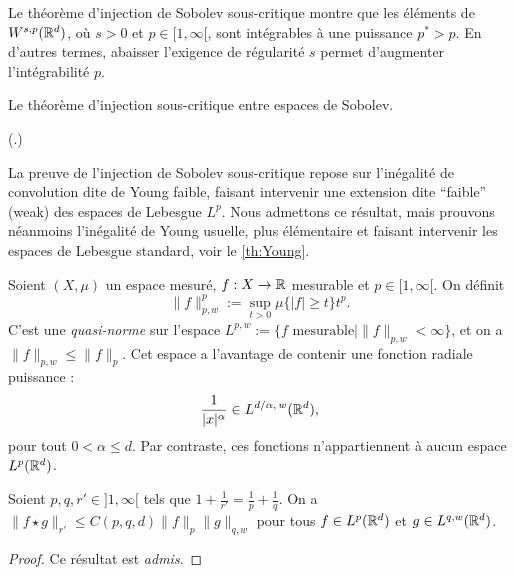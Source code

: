 Le théorème d'injection de Sobolev sous-critique montre que les éléments de $W^{s,p}(\mathbb{R}^d)$, où $s>0$ et $p\in [1,\infty[$, sont intégrables à une puissance $p^*>p$. En d'autres termes, abaisser l'exigence de régularité $s$ permet d'augmenter l'intégrabilité $p$. 

\begin{retenir}
Le théorème d'injection sous-critique entre espaces de Sobolev.

\noindent
(.)	
\end{retenir}

La preuve de l'injection de Sobolev sous-critique repose sur l'inégalité de convolution dite de Young faible, faisant intervenir une extension dite ``faible'' (weak) des espaces de Lebesgue  $L^p$. Nous admettons ce résultat, mais prouvons néanmoins l'inégalité de Young usuelle, plus élémentaire et faisant intervenir les espaces de Lebesgue standard, voir le \cref{th:Young}.

Soient $(X,\mu)$ un espace mesuré, $f : X \to \mathbb{R}$ mesurable et $p \in [1,\infty[$. On définit 
\begin{equation*}
	\|f\|^p_{p,w} := \sup_{t > 0} \mu\{|f|\geq t\} t^p.
\end{equation*}
C'est une \emph{quasi-norme} sur l'espace $L^{p,w} := \{f \text{ mesurable}\mid \|f\|_{p,w} < \infty\}$, et on a $\|f\|_{p,w} \leq \|f\|_p$. 
Cet espace a l'avantage de contenir une fonction radiale puissance : 
\begin{equation}
\label{eq:powLpw}
	\frac 1 {|x|^\alpha} \in L^{d/\alpha,\, w} (\bR^d),
\leancheck{eq:powLpw}%
\end{equation}
pour tout $0< \alpha \leq d$. Par contraste, ces fonctions n'appartiennent à aucun espace $L^p (\mathbb{R}^d)$.

\begin{theorem}
\label{th:YoungFaible}
%
	Soient $p,q,r'\in ]1,\infty[$ tels que $1+ \frac 1 {r'} = \frac 1 p + \frac 1 q$. 
	On a 
	$\|f\star g \|_{r'} \leq C(p,q,d) \|f\|_p \|g\|_{q,w}$ pour tous $f \in L^p(\mathbb{R}^d)$ et $g\in L^{q,w}(\mathbb{R}^d)$.
\end{theorem}

\begin{proof}
	Ce résultat est \emph{admis}.  %
\end{proof}


